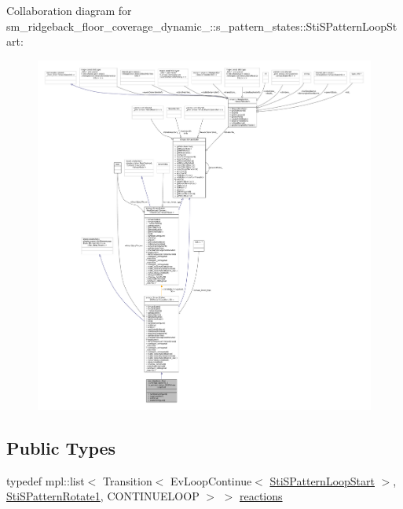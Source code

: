 Collaboration diagram for sm\+\_\+ridgeback\+\_\+floor\+\_\+coverage\+\_\+dynamic\+\_\+:\+:s\+\_\+pattern\+\_\+states\+:\+:Sti\+S\+Pattern\+Loop\+Start\+:
\nopagebreak
\begin{figure}[H]
\begin{center}
\leavevmode
\includegraphics[width=350pt]{structsm__ridgeback__floor__coverage__dynamic__1_1_1s__pattern__states_1_1StiSPatternLoopStart__coll__graph}
\end{center}
\end{figure}
\subsection*{Public Types}
\begin{DoxyCompactItemize}
\item 
typedef mpl\+::list$<$ Transition$<$ Ev\+Loop\+Continue$<$ \hyperlink{structsm__ridgeback__floor__coverage__dynamic__1_1_1s__pattern__states_1_1StiSPatternLoopStart}{Sti\+S\+Pattern\+Loop\+Start} $>$, \hyperlink{structsm__ridgeback__floor__coverage__dynamic__1_1_1s__pattern__states_1_1StiSPatternRotate1}{Sti\+S\+Pattern\+Rotate1}, C\+O\+N\+T\+I\+N\+U\+E\+L\+O\+OP $>$ $>$ \hyperlink{structsm__ridgeback__floor__coverage__dynamic__1_1_1s__pattern__states_1_1StiSPatternLoopStart_ab5c8d1560c9b58c3aadb5465d370fb4e}{reactions}
\end{DoxyCompactItemize}

